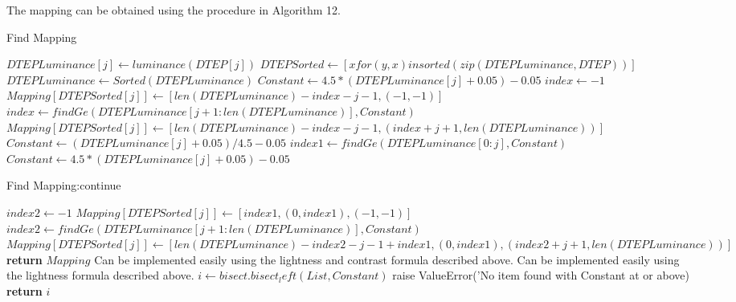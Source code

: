 The mapping can be obtained using the procedure in Algorithm 12.
\begin{algorithm}[!htb]
\caption{Find Mapping}\label{Find Mapping}
\begin{algorithmic}[1]
	\State $DTEPLuminance[j] \gets luminance(DTEP[j])$
\EndFor
\State $DTEPSorted \gets [x for (y,x) in sorted(zip(DTEPLuminance,DTEP))]$ 
\State $DTEPLuminance \gets Sorted(DTEPLuminance)$ 
	  
		\State $Constant \gets 4.5*(DTEPLuminance[j]+0.05) - 0.05$
			\State $index \gets -1$
			\State	$Mapping[DTEPSorted[j]] \gets [len(DTEPLuminance)-index-j-1,(-1,-1)]$
		\Else
		\State $index \gets findGe(DTEPLuminance[j+1:len(DTEPLuminance)],Constant)$
		\State	$Mapping[DTEPSorted[j]] \gets [len(DTEPLuminance)-index-j-1,(index+j+1,len(DTEPLuminance))]$
		\EndIf
	\Else 		{}											
	\State $Constant \gets (DTEPLuminance[j]+0.05)/4.5 - 0.05$
	\State	$index1 \gets findGe(DTEPLuminance[0:j],Constant)$
	\State $Constant \gets 4.5*(DTEPLuminance[j]+0.05) - 0.05$
	\EndIf
{}
\end{algorithmic}
\end{algorithm}

\begin{algorithm}[!htb]
\caption{Find Mapping:continue}\label{Find Mapping}
\begin{algorithmic}[1]	
		\State $index2 \gets -1$
		\State $Mapping[DTEPSorted[j]] \gets [index1,(0,index1),(-1,-1)]$
	\Else		
	\State $index2 \gets findGe(DTEPLuminance[j+1:len(DTEPLuminance)],Constant)$
	\State $Mapping[DTEPSorted[j]] \gets [len(DTEPLuminance)-index2-j-1 + index1,(0,index1),(index2+j+1,len(DTEPLuminance))]$
	\EndIf
\EndFor
\textbf{return } $Mapping$
\EndProcedure
{}
\State Can be implemented easily using the lightness and contrast formula described above.
\EndProcedure
{}
\State Can be implemented easily using the lightness formula described above. 
\EndProcedure
{}
\State $i \gets bisect.bisect_left(List, Constant)$
    \State raise ValueError('No item found with Constant at or above)
\EndIf
\State \textbf{return} $i$
\EndProcedure
\end{algorithmic}
\end{algorithm}

